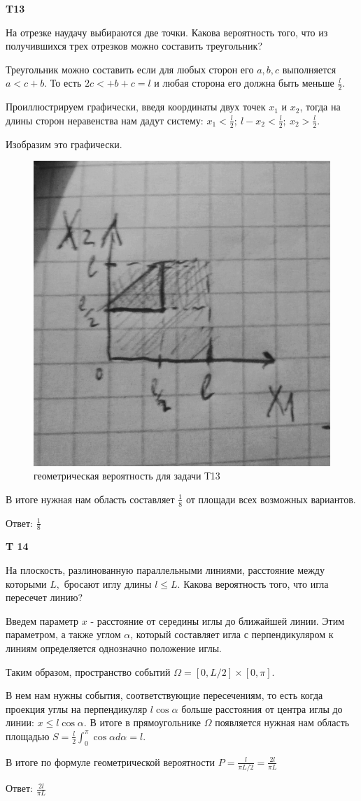 \documentclass[a4paper,12pt]{article} %
\begin{document}
\begin{example}\textbf{T13}

На отрезке наудачу выбираются две точки. 
Какова вероятность того, что из получившихся трех отрезков можно составить треугольник?

Треугольник можно составить если для любых сторон его $ a,b,c$ выполняется $ a<c+b$. То есть $ 2c<+b+c=l$ и любая сторона его должна быть меньше $\frac{l}{2}$.

Проиллюстрируем графически, введя координаты двух точек $ x_1$ и $ x_2$, тогда на длины сторон неравенства нам дадут систему: $ x_1<\frac{l}{2}; \ l-x_2<\frac{l}{2}; \ x_2 > \frac{l}{2}$.

Изобразим это графически.

\begin{figure}[h!]
	\centering
	\includegraphics[width=0.2\linewidth]{t13}
	\caption{геометрическая вероятность для задачи Т13}
	\label{fig:t12}
\end{figure}

В итоге нужная нам область составляет $ \frac{1}{8}$ от площади всех возможных вариантов.

Ответ: $ \frac{1}{8}$

\end{example}




\begin{example}\textbf{T 14}

На плоскость, разлинованную параллельными линиями, расстояние между которыми $L,$ бросают иглу длины $l \leqslant L .$ 
Какова вероятность того, что игла пересечет линию?

Введем параметр $x$ - расстояние от середины иглы до ближайшей линии. 
Этим параметром, а также углом $\alpha$, который составляет игла с перпендикуляром к линиям определяется однозначно положение иглы.

Таким образом, пространство событий $ \Omega=[0,L/2]\times[0,\pi]$.

В нем нам нужны события, соответствующие пересечениям, то есть когда проекция углы на перпендикуляр $ l\cos\alpha$ больше расстояния от центра иглы до линии: $ x\le l\cos\alpha$.
В итоге в прямоугольнике $\Omega$ появляется нужная нам область площадью $ S=\frac{l}{2}\int_0^{\pi} \cos\alpha d \alpha=l$.

В итоге по формуле геометрической вероятности $ P=\frac{l}{\pi L/2}=\frac{2l}{\pi L} $


Ответ: $\frac{2l}{\pi L}$

\end{example}
\end{document}
